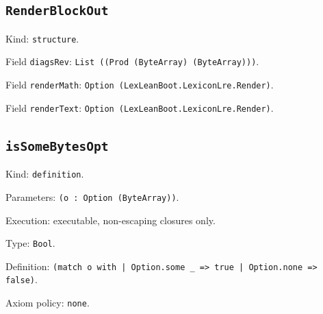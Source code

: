 \documentclass[11pt]{article}
\begin{document}
\subsection*{\texttt{RenderBlockOut}}
\noindent Kind: \texttt{structure}.\par
\noindent Field \texttt{diagsRev}: \texttt{List ((Prod (ByteArray) (ByteArray)))}.\par
\noindent Field \texttt{renderMath}: \texttt{Option (LexLeanBoot.LexiconLre.Render)}.\par
\noindent Field \texttt{renderText}: \texttt{Option (LexLeanBoot.LexiconLre.Render)}.\par
\subsection*{\texttt{isSomeBytesOpt}}
\noindent Kind: \texttt{definition}.\par
\noindent Parameters: \texttt{(o : Option (ByteArray))}.\par
\noindent Execution: executable, non-escaping closures only.\par
\noindent Type: \texttt{Bool}.\par
\noindent Definition: \texttt{(match o with | Option.some \_ => true | Option.none => false)}.\par
\noindent Axiom policy: \texttt{none}.\par
\end{document}

